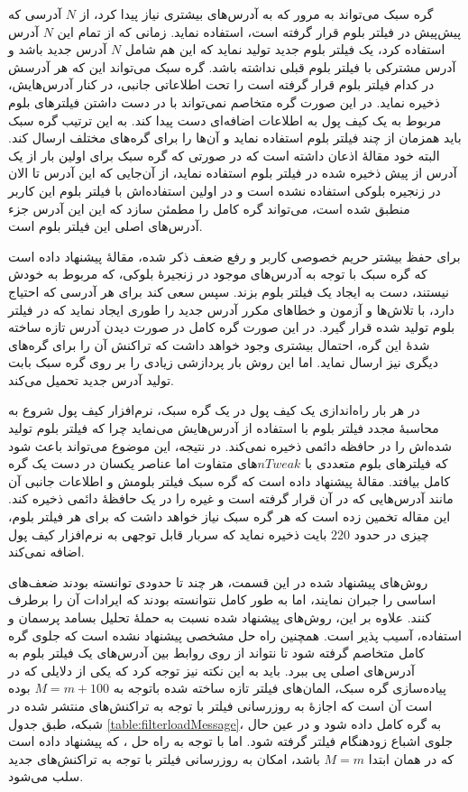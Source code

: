 	گره سبک می‌تواند به مرور که به آدرس‌های بیشتری نیاز پیدا کرد، از $N$ آدرسی که پیش‌پیش در فیلتر بلوم قرار گرفته است، استفاده نماید. زمانی که از تمام این $N$ آدرس استفاده کرد، یک فیلتر بلوم جدید تولید نماید که این هم شامل $N$ آدرس جدید باشد و آدرس مشترکی با فیلتر بلوم قبلی نداشته باشد. گره سبک می‌تواند این که هر آدرسش در کدام فیلتر بلوم قرار گرفته‌ است را تحت اطلاعاتی جانبی، در کنار آدرس‌هایش، ذخیره نماید. در این صورت گره متخاصم نمی‌تواند با در دست داشتن فیلتر‌های بلوم مربوط به یک کیف پول به اطلاعات اضافه‌ای دست پیدا کند. به این ترتیب گره سبک باید همزمان از چند فیلتر بلوم استفاده نماید و آن‌ها را برای گره‌های مختلف ارسال کند. البته خود مقالهٔ \cite{Gervais2014} اذعان داشته است که در صورتی که گره سبک برای اولین بار از یک آدرس از پیش ذخیره شده در فیلتر بلوم استفاده نماید، از آن‌جایی که این آدرس تا الان در زنجیره بلوکی استفاده نشده است و در اولین استفاده‌اش با فیلتر بلوم این کاربر منطبق شده است، می‌تواند گره کامل را مطمئن سازد که این این آدرس جزء آدرس‌های اصلی این فیلتر بلوم است.
	
	برای حفظ بیشتر حریم خصوصی کاربر و رفع ضعف ذکر شده، مقالهٔ \cite{Gervais2014} پیشنهاد داده است که گره سبک با توجه به آدرس‌های موجود در زنجیرهٔ بلوکی، که مربوط به خودش نیستند، دست به ایجاد یک فیلتر بلوم بزند. سپس سعی کند برای هر آدرسی که احتیاج دارد، با تلاش‌ها و آزمون‌ و خطا‌های مکرر آدرس جدید را طوری ایجاد نماید که در فیلتر بلوم تولید شده قرار گیرد. در این صورت گره کامل در صورت دیدن آدرس تازه ساخته شدهٔ این گره، احتمال بیشتری وجود خواهد داشت که تراکنش آن را برای گره‌های دیگری نیز ارسال نماید. اما این روش بار پردازشی زیادی را بر روی گره سبک بابت تولید آدرس جدید تحمیل می‌کند.  
	
در هر بار راه‌اندازی یک کیف پول در یک گره سبک، نرم‌افزار کیف پول شروع به محاسبهٔ مجدد فیلتر بلوم با استفاده از آدرس‌هایش می‌نماید چرا که فیلتر بلوم تولید شده‌اش را در حافظه دائمی ذخیره نمی‌کند. در نتیجه، این موضوع می‌تواند باعث شود که فیلتر‌های بلوم متعددی با $nTweak$های متفاوت اما عناصر یکسان در دست یک گره کامل بیافتد. مقالهٔ \cite{Gervais2014} پیشنهاد داده است که گره سبک فیلتر بلومش و اطلاعات جانبی آن مانند آدرس‌هایی که در آن قرار گرفته است و غیره را در یک حافظهٔ دائمی ذخیره کند. این مقاله تخمین زده است که هر گره سبک نیاز خواهد داشت که برای هر فیلتر بلوم، چیزی در حدود $220$ بایت ذخیره نماید که سربار قابل توجهی به نرم‌افزار کیف پول اضافه نمی‌کند.
	
	روش‌های پیشنهاد شده در این قسمت، هر چند تا حدودی توانسته بودند ضعف‌های اساسی \cite{Hearn2013} را جبران نمایند، اما به طور کامل نتوانسته بودند که ایرادات آن را برطرف کنند.  علاوه بر این، روش‌های پیشنهاد شده نسبت به حملهٔ تحلیل بسامد پرسمان و استفاده، آسیب پذیر است. همچنین راه حل مشخصی  پیشنهاد نشده است که جلوی گره کامل متخاصم گرفته شود تا نتواند از روی روابط بین آدرس‌های یک فیلتر بلوم به آدرس‌های اصلی پی ببرد. باید به این نکته نیز توجه کرد که یکی از دلایلی که در پیاده‌سازی گره سبک، المان‌های فیلتر تازه ساخته شده باتوجه به $M=m+100$ بوده است آن است که اجازهٔ به روزرسانی فیلتر با توجه به تراکنش‌های منتشر شده در شبکه، طبق جدول \ref{table:filterloadMessage}، به گره کامل داده شود و در عین حال جلوی اشباع زودهنگام فیلتر گرفته شود. اما با توجه به راه حل \cite{Gervais2014}، که پیشنهاد داده است که در همان ابتدا $M=m$ باشد، امکان به روزرسانی فیلتر با توجه به تراکنش‌های جدید سلب می‌شود.


